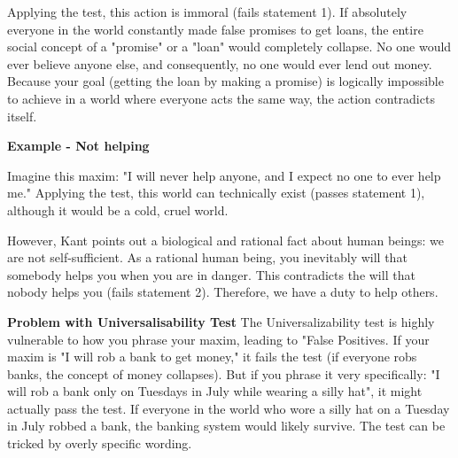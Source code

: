 \documentclass[12pt]{article}
\begin{document}
\noindent Applying the test, this action is immoral (fails statement 1).
If absolutely everyone in the world constantly made false promises to get loans, the entire social concept of a "promise" or a "loan" would completely collapse. No one would ever believe anyone else, and consequently, no one would ever lend out money.
Because your goal (getting the loan by making a promise) is logically impossible to achieve in a world where everyone acts the same way, the action contradicts itself.

\noindent\textbf{Example - Not helping}

\noindent Imagine this maxim: "I will never help anyone, and I expect no one to ever help me."
Applying the test, this world can technically exist (passes statement 1), although it would be a cold, cruel world.

\noindent However, Kant points out a biological and rational fact about human beings: we are not self-sufficient.
As a rational human being, you inevitably will that somebody helps you when you are in danger.
This contradicts the will that nobody helps you (fails statement 2).
Therefore, we have a duty to help others.

\vspace{1em}
\noindent\textbf{Problem with Universalisability Test}
The Universalizability test is highly vulnerable to how you phrase your maxim, leading to "False Positives.
If your maxim is "I will rob a bank to get money," it fails the test (if everyone robs banks, the concept of money collapses).
But if you phrase it very specifically: "I will rob a bank only on Tuesdays in July while wearing a silly hat", it might actually pass the test.
If everyone in the world who wore a silly hat on a Tuesday in July robbed a bank, the banking system would likely survive.
The test can be tricked by overly specific wording.
\end{document}
